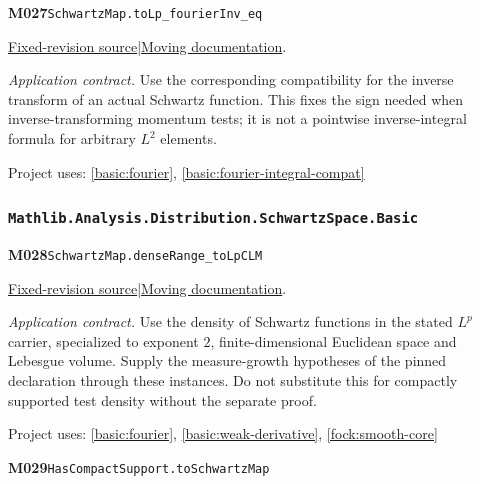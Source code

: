\documentclass[11pt,a4paper]{article}
\theoremstyle{definition}
\theoremstyle{remark}
\begin{document}
\noindent\textbf{M027}\label{base:M027}\quad\nolinkurl{SchwartzMap.toLp_fourierInv_eq}

\href{https://github.com/leanprover-community/mathlib4/blob/9bac2d0692944a775113f7c130fd5e5b4608a854/Mathlib/Analysis/Fourier/LpSpace.lean}{Fixed-revision source}\quad|\quad\href{https://leanprover-community.github.io/mathlib4_docs/Mathlib/Analysis/Fourier/LpSpace.html#SchwartzMap.toLp_fourierInv_eq}{Moving documentation}.\par
\noindent\textit{Application contract.} Use the corresponding compatibility for the inverse transform of an actual Schwartz function. This fixes the sign needed when inverse-transforming momentum tests; it is not a pointwise inverse-integral formula for arbitrary $L^2$ elements.\par
{\small Project uses: \ref{basic:fourier}, \ref{basic:fourier-integral-compat}}\par\medskip

\subsubsection*{\nolinkurl{Mathlib.Analysis.Distribution.SchwartzSpace.Basic}}
\noindent\textbf{M028}\label{base:M028}\quad\nolinkurl{SchwartzMap.denseRange_toLpCLM}

\href{https://github.com/leanprover-community/mathlib4/blob/9bac2d0692944a775113f7c130fd5e5b4608a854/Mathlib/Analysis/Distribution/SchwartzSpace/Basic.lean}{Fixed-revision source}\quad|\quad\href{https://leanprover-community.github.io/mathlib4_docs/Mathlib/Analysis/Distribution/SchwartzSpace/Basic.html#SchwartzMap.denseRange_toLpCLM}{Moving documentation}.\par
\noindent\textit{Application contract.} Use the density of Schwartz functions in the stated $L^p$ carrier, specialized to exponent $2$, finite-dimensional Euclidean space and Lebesgue volume. Supply the measure-growth hypotheses of the pinned declaration through these instances. Do not substitute this for compactly supported test density without the separate proof.\par
{\small Project uses: \ref{basic:fourier}, \ref{basic:weak-derivative}, \ref{fock:smooth-core}}\par\medskip

\noindent\textbf{M029}\label{base:M029}\quad\nolinkurl{HasCompactSupport.toSchwartzMap}
\end{document}
